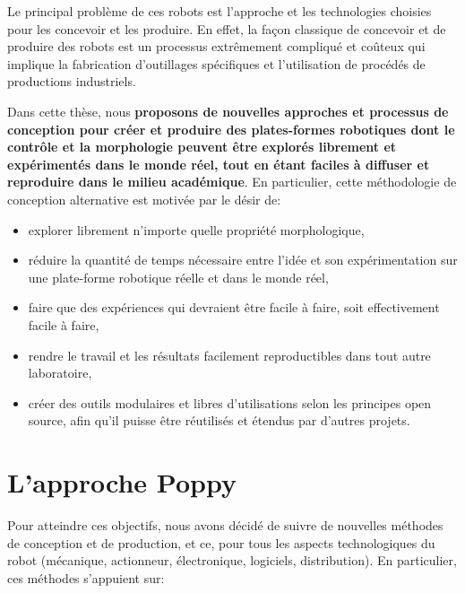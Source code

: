 Le principal problème de ces robots est l’approche et les technologies choisies pour les concevoir et les produire. En effet, la façon classique de concevoir et de produire des robots est un processus extrêmement compliqué et coûteux qui implique la fabrication d’outillages spécifiques et l'utilisation de procédés de productions industriels.

Dans cette thèse, nous \textbf {proposons de nouvelles approches et processus de conception pour créer et produire des plates-formes robotiques dont le contrôle et la morphologie peuvent être explorés librement et expérimentés dans le monde réel, tout en étant faciles à diffuser et reproduire dans le milieu académique}. En particulier, cette méthodologie de conception alternative est motivée par le désir de:
\begin{itemize}
    \item explorer librement n'importe quelle propriété morphologique,
    \item réduire la quantité de temps nécessaire entre l'idée et son expérimentation sur une plate-forme robotique réelle et dans le monde réel,
    \item faire que des expériences qui devraient être facile à faire, soit effectivement facile à faire,
    \item rendre le travail et les résultats facilement reproductibles dans tout autre laboratoire,
    \item créer des outils modulaires et libres d'utilisations selon les principes open source, afin qu’il puisse être réutilisés et étendus par d'autres projets.
\end{itemize}


\section*{L'approche Poppy}

Pour atteindre ces objectifs, nous avons décidé de suivre de nouvelles méthodes de conception et de production, et ce, pour tous les aspects technologiques du robot (mécanique, actionneur, électronique, logiciels, distribution). En particulier, ces méthodes s'appuient sur:


